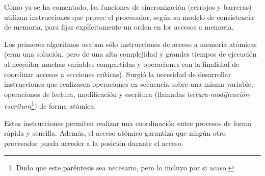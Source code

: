 Como ya se ha comentado, las funciones de sincronización (cerrojos y barreras) utilizan instrucciones que provee el procesador, según su modelo de consistencia de memoria, para fijar explícitamente un orden en los accesos a memoria.

Los primeros algoritmos usaban sólo instrucciones de acceso a memoria atómicas (eran una solución, pero de una alta complejidad y grandes tiempos de ejecución al necesitar muchas variables compartidas y operaciones con la finalidad de coordinar accesos a secciones críticas). Surgió la necesidad de desarrollar instrucciones que realizasen operaciones en secuencia sobre una misma variable, operaciones de lectura, modificación y escritura (llamadas \emph{lectura-modificación-escritura}\footnote{Dudo que este paréntesis sea necesario, pero lo incluyo por si acaso.}) de forma atómica.

Estas instrucciones permiten realizar una coordinación entre procesos de forma rápida y sencilla. Además, el acceso atómico garantiza que ningún otro procesador pueda acceder a la posición durante el acceso.\\

